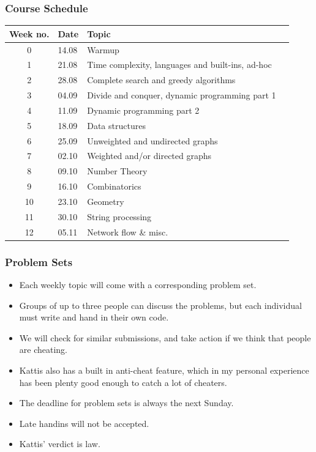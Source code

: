 \documentclass{beamer}
\begin{document}
\begin{frame}[plain]
	\frametitle{Course Schedule}
	\scriptsize
    \begin{center}
        \begin{tabular}{cl|ll}
            Week no. & Date & Topic \\
            \hline
            0 & 14.08 & Warmup \\
            1 & 21.08 & Time complexity, languages and built-ins, ad-hoc \\
            2 & 28.08 & Complete search and greedy algorithms \\
            3 & 04.09 & Divide and conquer, dynamic programming part 1 \\
            4 & 11.09 & Dynamic programming part 2 \\
            5 & 18.09 & Data structures \\
            6 & 25.09 & Unweighted and undirected graphs \\
            7 & 02.10 & Weighted and/or directed graphs \\
            8 & 09.10 & Number Theory \\
            9 & 16.10 & Combinatorics \\
            10 & 23.10 & Geometry \\
            11 & 30.10 & String processing \\
            12 & 05.11 & Network flow \& misc. \\
    		\end{tabular}
	\end{center}
\end{frame}
 
\begin{frame}[plain]
	\frametitle{Problem Sets}
	\begin{itemize}
		\item Each weekly topic will come with a corresponding problem set.
		\item Groups of up to three people can discuss the problems, but each individual must write and hand in their own code.
        \item We will check for similar submissions, and take action if we think that people are cheating.
        \item Kattis also has a built in anti-cheat feature, which in my personal experience has been plenty good enough to catch a lot of cheaters.
        \item The deadline for problem sets is always the next Sunday.
        \item Late handins will not be accepted.
        \item Kattis' verdict is law.
	\end{itemize}
\end{frame} 
\end{document}
